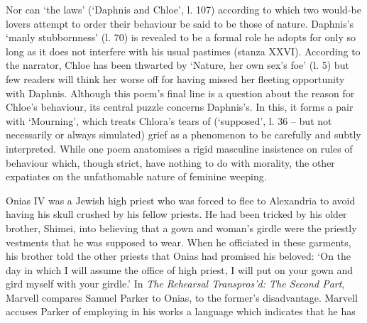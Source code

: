 ﻿\documentclass[12pt]{article}
\newcommand{\citedtitle}[1]{\textit{#1}}
\begin{document}
Nor
can ‘the laws’ (‘Daphnis and Chloe’, l. 107) according to which two would-be
lovers attempt to order their behaviour be said to be those of nature.
Daphnis’s ‘manly stubbornness’ (l. 70) is revealed to be a formal role he
adopts for only so long as it does not interfere with his usual pastimes
(stanza XXVI). According to the narrator, Chloe
has been thwarted by ‘Nature, her own sex’s foe’ (l. 5) but few readers will
think her worse off for having missed her fleeting opportunity with Daphnis.
Although this poem’s final line is a question about the reason for Chloe’s
behaviour, its central puzzle concerns Daphnis’s. In this, it forms a pair with
‘Mourning’, which treats Chlora’s tears of (‘supposed’, l. 36 – but not
necessarily or always simulated) grief as a phenomenon to be carefully and
subtly interpreted. While one poem anatomises a rigid masculine insistence on
rules of behaviour which, though strict, have nothing to do with morality, the
other expatiates on the unfathomable nature of feminine weeping.

Onias IV was a Jewish high priest who was
forced to flee to Alexandria to avoid having his skull crushed by his fellow
priests. He had been tricked by his older brother, Shimei, into believing that
a gown and woman’s girdle were the priestly vestments that he was supposed to
wear. When he officiated in these garments, his brother told the other priests
that Onias had promised his beloved: ‘On the day in which I will assume the
office of high priest, I will put on your gown and gird myself with your
girdle.’ In \citedtitle{The Rehearsal Transpros’d: The Second Part}, Marvell compares Samuel Parker to
Onias, to the former’s disadvantage. Marvell accuses Parker of employing in his
works a language which indicates that he has 
\end{document}
